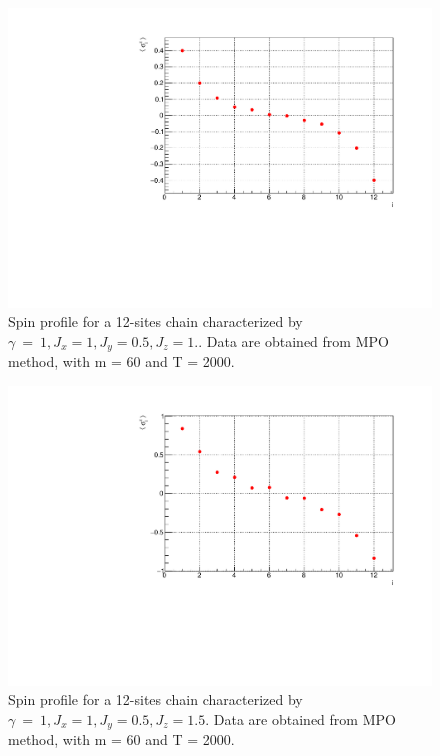 \begin{figure}[H]
    \centering
    \includegraphics[scale=0.7]{Figures/12sites/LML012m060Time002000_J1051.pdf}
    \caption{Spin profile for a 12-sites chain characterized by $\gamma~=~1, J_x=1, J_y=0.5, J_z=1.$. Data are obtained from MPO method, with m = 60 and T = 2000.}
    \label{fig:my_label}
\end{figure}

\begin{figure}[H]
    \centering
    \includegraphics[scale=0.7]{Figures/12sites/LML012m060Time002000_J10515.pdf}
    \caption{Spin profile for a 12-sites chain characterized by $\gamma~=~1, J_x=1, J_y=0.5, J_z=1.5$. Data are obtained from MPO method, with m = 60 and T = 2000.}
    \label{fig:my_label}
\end{figure}

